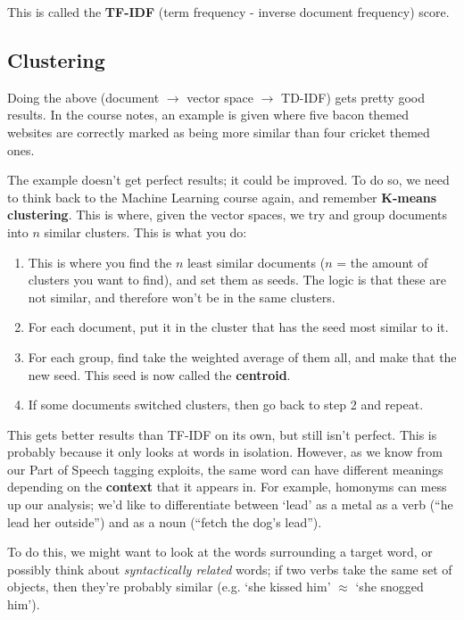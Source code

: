 This is called the \textbf{TF-IDF} (term frequency - inverse document frequency)
score.

\subsection{Clustering}

Doing the above (document $\rightarrow$ vector space $\rightarrow$ TD-IDF) gets
pretty good results. In the course notes, an example is given where five bacon
themed websites are correctly marked as being more similar than four cricket
themed ones.

The example doesn't get perfect results; it could be improved. To do so, we need
to think back to the Machine Learning course again, and remember \textbf{K-means
clustering}. This is where, given the vector spaces, we try and group documents
into $n$ similar clusters. This is what you do:

\begin{enumerate}
  \item This is where you find the $n$ least similar documents ($n$ = the
    amount of clusters you want to find), and set them as seeds. The logic is
    that these are not similar, and therefore won't be in the same clusters.
  \item For each document, put it in the cluster that has the seed most similar 
    to it.
  \item For each group, find take the weighted average of them all, and make 
    that the new seed. This seed is now called the \textbf{centroid}.
  \item If some documents switched clusters, then go back to step 2 and repeat.
\end{enumerate}

This gets better results than TF-IDF on its own, but still isn't perfect. This
is probably because it only looks at words in isolation. However, as we know
from our Part of Speech tagging exploits, the same word can have different
meanings depending on the \textbf{context} that it appears in. For example,
homonyms can mess up our analysis; we'd like to differentiate between `lead' as
a metal as a verb (``he lead her outside'') and as a noun (``fetch the dog's
lead'').

To do this, we might want to look at the words surrounding a target word, or
possibly think about \textit{syntactically related} words; if two verbs take the
same set of objects, then they're probably similar (e.g. `she kissed him'
$\approx$ `she snogged him').

